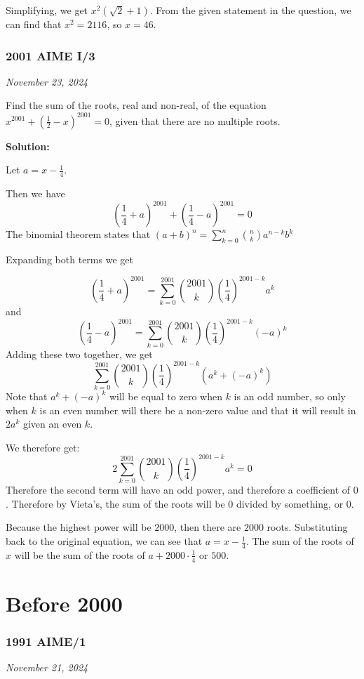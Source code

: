 \documentclass[../mathproblems.tex]{subfiles}
\begin{document}
Simplifying, we get $x^2(\sqrt{2}+1)$. From the given statement in the question, we can find that $x^2=2116$, so $x=\boxed{46}$. 

\noindent\hrulefill
\subsubsection*{2001 AIME I/3} 
\textit{November 23, 2024}

Find the sum of the roots, real and non-real, of the equation $x^{2001}+\left(\frac 12-x\right)^{2001}=0$, given that there are no multiple roots.

\textbf{Solution:}

Let $a=x-\frac{1}{4}$.

Then we have
\[ \left(\frac{1}{4}+a\right)^{2001} + \left(\frac{1}{4}-a\right)^{2001} = 0\]
The binomial theorem states that $(a+b)^n = \sum_{k=0}^n \binom{n}{k} a^{n-k}b^k$

Expanding both terms we get

\[ \left(\frac{1}{4}+a\right)^{2001} = \sum_{k=0}^{2001} \binom{2001}{k}\left(\frac{1}{4}\right)^{2001-k}a^k\]and
\[ \left(\frac{1}{4}-a\right)^{2001} = \sum_{k=0}^{2001} \binom{2001}{k}\left(\frac{1}{4}\right)^{2001-k}(-a)^k\]
Adding these two together, we get
\[ \sum_{k=0}^{2001} \binom{2001}{k}\left(\frac{1}{4}\right)^{2001-k} (a^k+(-a)^k)\]
Note that $a^k+(-a)^k$ will be equal to zero when $k$ is an odd number, so only when $k$ is an even number will there be a non-zero value and that it will result in $2a^k$ given an even $k$.

We therefore get:
\[ 2\sum_{k=0}^{2001} \binom{2001}{k}\left(\frac{1}{4}\right)^{2001-k} a^k = 0\]
Therefore the second term will have an odd power, and therefore a coefficient of $0$. Therefore by Vieta's, the sum of the roots will be $0$ divided by something, or $0$.

Because the highest power will be $2000$, then there are $2000$ roots. Substituting back to the original equation, we can see that $a = x-\frac{1}{4}$. The sum of the roots of $x$ will be the sum of the roots of $a+2000\cdot\frac{1}{4}$ or $\boxed{500}$.

\noindent\hrulefill
\section{Before 2000}
\subsubsection*{1991 AIME/1} 
\textit{November 21, 2024}
\end{document}
